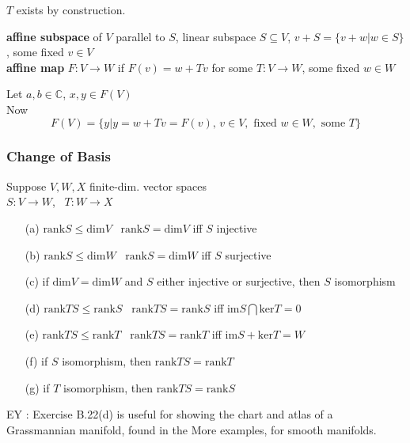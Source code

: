 $T$ exists by construction.
\hrulefill


\textbf{ affine subspace } of $V$ parallel to $S$, linear subspace $S \subseteq V$, $v + S = \lbrace v + w | w \in S \rbrace$, some fixed $v \in V$ \\

\textbf{affine map } $F: V \to W$ if $F(v) = w + Tv$ for some $T: V \to W$, some fixed $w\in W$ \\


Let $a,b \in \mathbb{C}$, $x, y \in F(V)$ \\

Now 
\[
F(V) = \lbrace y | y = w + Tv = F(v), \, v \in V, \text{ fixed } w \in W , \text{ some } T \rbrace
\]

\subsubsection{Change of Basis}




 Suppose $V,W, X$ finite-dim. vector spaces \\
$S:V\to W$, \, $T:W \to X$

\begin{enumerate}
\item[(a)] $\text{rank}S \leq \text{dim}V$ \quad \, $\text{rank}S = \text{dim}V$ iff $S$ injective
\item[(b)] $\text{rank}S \leq \text{dim}W$ \quad \, $\text{rank}S = \text{dim}W$ iff $S$ surjective
\item[(c)] if $\text{dim}V = \text{dim}W$ and $S$ either injective or surjective, then $S$ isomorphism 
\item[(d)] $\text{rank}TS \leq \text{rank}S$ \quad \, $\text{rank}TS = \text{rank}S$ iff $\text{im}S \bigcap \text{ker}T = 0$ 
\item[(e)] $\text{rank}TS \leq \text{rank}T$ \quad \, $\text{rank}TS = \text{rank}T$ iff $\text{im}S + \text{ker}T = W$
\item[(f)] if $S$ isomorphism, then $\text{rank}TS = \text{rank}T$
\item[(g)] if $T$ isomorphism, then $\text{rank}TS = \text{rank}S$
\end{enumerate}

EY : Exercise B.22(d) is useful for showing the chart and atlas of a Grassmannian manifold, found in the More examples, for smooth manifolds.  

